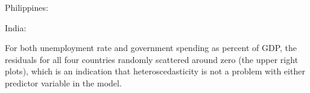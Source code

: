 \documentclass[11pt]{article}
\begin{document}
Philippines:
\begin{figure}[H]
\captionsetup[subfigure]{labelformat=empty}
\centering
{}
\end{figure}

India:
\begin{figure}[H]
\captionsetup[subfigure]{labelformat=empty}
\centering
{}
\end{figure}

For both unemployment rate and government spending as percent of GDP, the residuals for all four countries randomly scattered around zero (the upper right plots), which is an indication that heteroscedasticity is not a problem with either predictor variable in the model\citep{Residual1}.



\end{document}
